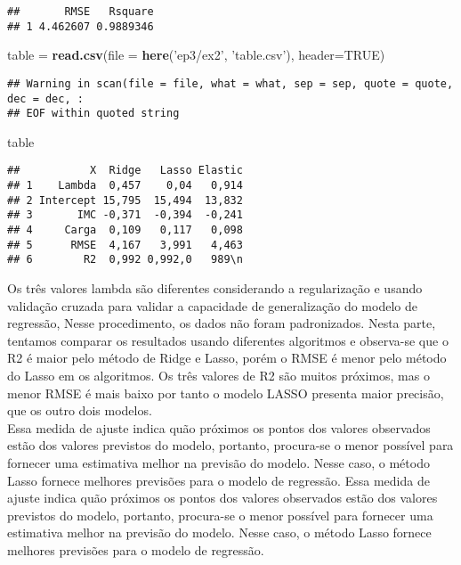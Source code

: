 \documentclass[]{article}
\newenvironment{Shaded}{\begin{snugshade}}{\end{snugshade}}
\newcommand{\DataTypeTok}[1]{\textcolor[rgb]{0.13,0.29,0.53}{#1}}
\newcommand{\KeywordTok}[1]{\textcolor[rgb]{0.13,0.29,0.53}{\textbf{#1}}}
\newcommand{\NormalTok}[1]{#1}
\newcommand{\OtherTok}[1]{\textcolor[rgb]{0.56,0.35,0.01}{#1}}
\newcommand{\StringTok}[1]{\textcolor[rgb]{0.31,0.60,0.02}{#1}}
\begin{document}
\begin{verbatim}
##       RMSE   Rsquare
## 1 4.462607 0.9889346
\end{verbatim}

\begin{Shaded}
\begin{Highlighting}[]
\NormalTok{table =}\StringTok{ }\KeywordTok{read.csv}\NormalTok{(}\DataTypeTok{file =} \KeywordTok{here}\NormalTok{(}\StringTok{'ep3/ex2'}\NormalTok{, }\StringTok{'table.csv'}\NormalTok{), }\DataTypeTok{header=}\OtherTok{TRUE}\NormalTok{)}
\end{Highlighting}
\end{Shaded}

\begin{verbatim}
## Warning in scan(file = file, what = what, sep = sep, quote = quote, dec = dec, :
## EOF within quoted string
\end{verbatim}

\begin{Shaded}
\begin{Highlighting}[]
\NormalTok{table}
\end{Highlighting}
\end{Shaded}

\begin{verbatim}
##           X  Ridge   Lasso Elastic
## 1    Lambda  0,457    0,04   0,914
## 2 Intercept 15,795  15,494  13,832
## 3       IMC -0,371  -0,394  -0,241
## 4     Carga  0,109   0,117   0,098
## 5      RMSE  4,167   3,991   4,463
## 6        R2  0,992 0,992,0   989\n
\end{verbatim}

Os três valores lambda são diferentes considerando a regularização e
usando validação cruzada para validar a capacidade de generalização do
modelo de regressão, Nesse procedimento, os dados não foram
padronizados. Nesta parte, tentamos comparar os resultados usando
diferentes algoritmos e observa-se que o R2 é maior pelo método de Ridge
e Lasso, porém o RMSE é menor pelo método do Lasso em os algoritmos. Os
três valores de R2 são muitos próximos, mas o menor RMSE é mais baixo
por tanto o modelo LASSO presenta maior precisão, que os outro dois
modelos.\\
Essa medida de ajuste indica quão próximos os pontos dos valores
observados estão dos valores previstos do modelo, portanto, procura-se o
menor possível para fornecer uma estimativa melhor na previsão do
modelo. Nesse caso, o método Lasso fornece melhores previsões para o
modelo de regressão. Essa medida de ajuste indica quão próximos os
pontos dos valores observados estão dos valores previstos do modelo,
portanto, procura-se o menor possível para fornecer uma estimativa
melhor na previsão do modelo. Nesse caso, o método Lasso fornece
melhores previsões para o modelo de regressão.
\end{document}
